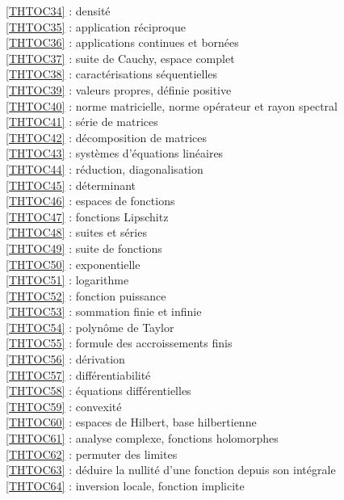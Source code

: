 \ref {THTOC34} : densité\\
\ref {THTOC35} : application réciproque\\
\ref {THTOC36} : applications continues et bornées\\
\ref {THTOC37} : suite de Cauchy, espace complet\\
\ref {THTOC38} : caractérisations séquentielles\\
\ref {THTOC39} : valeurs propres, définie positive\\
\ref {THTOC40} : norme matricielle, norme opérateur et rayon spectral\\
\ref {THTOC41} : série de matrices\\
\ref {THTOC42} : décomposition de matrices\\
\ref {THTOC43} : systèmes d'équations linéaires\\
\ref {THTOC44} : réduction, diagonalisation\\
\ref {THTOC45} : déterminant\\
\ref {THTOC46} : espaces de fonctions\\
\ref {THTOC47} : fonctions Lipschitz\\
\ref {THTOC48} : suites et séries\\
\ref {THTOC49} : suite de fonctions\\
\ref {THTOC50} : exponentielle\\
\ref {THTOC51} : logarithme\\
\ref {THTOC52} : fonction puissance\\
\ref {THTOC53} : sommation finie et infinie\\
\ref {THTOC54} : polynôme de Taylor\\
\ref {THTOC55} : formule des accroissements finis\\
\ref {THTOC56} : dérivation\\
\ref {THTOC57} : différentiabilité\\
\ref {THTOC58} : équations différentielles\\
\ref {THTOC59} : convexité\\
\ref {THTOC60} : espaces de Hilbert, base hilbertienne\\
\ref {THTOC61} : analyse complexe, fonctions holomorphes\\
\ref {THTOC62} : permuter des limites\\
\ref {THTOC63} : déduire la nullité d'une fonction depuis son intégrale\\
\ref {THTOC64} : inversion locale, fonction implicite\\
